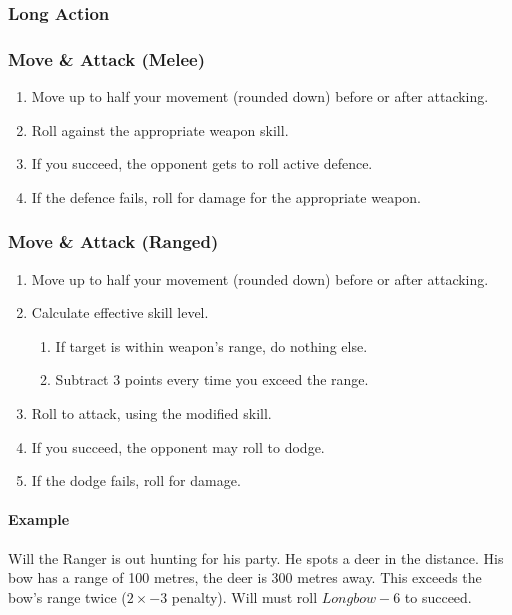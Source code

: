 \subsubsection{Long Action}

\subsubsection{Move \& Attack (Melee)}
\begin{enumerate}
    \item Move up to half your movement (rounded down) before or after attacking.
    \item Roll against the appropriate weapon skill.
    \item If you succeed, the opponent gets to roll active defence.
    \item If the defence fails, roll for damage for the appropriate weapon.
\end{enumerate}

\subsubsection{Move \& Attack (Ranged)}
\begin{enumerate}
    \item Move up to half your movement (rounded down) before or after attacking.
    \item Calculate effective skill level.
        \begin{enumerate}
            \item If target is within weapon's range, do nothing else.
            \item Subtract 3 points every time you exceed the range.
        \end{enumerate}
    \item Roll to attack, using the modified skill.
    \item If you succeed, the opponent may roll to dodge.
    \item If the dodge fails, roll for damage.
\end{enumerate}

\paragraph{Example} Will the Ranger is out hunting for his party. He spots a deer in the distance. His bow has a range of 100 metres, the deer is 300 metres away. This exceeds the bow's range twice ($2\times -3$ penalty). Will must roll $Longbow-6$ to succeed.

